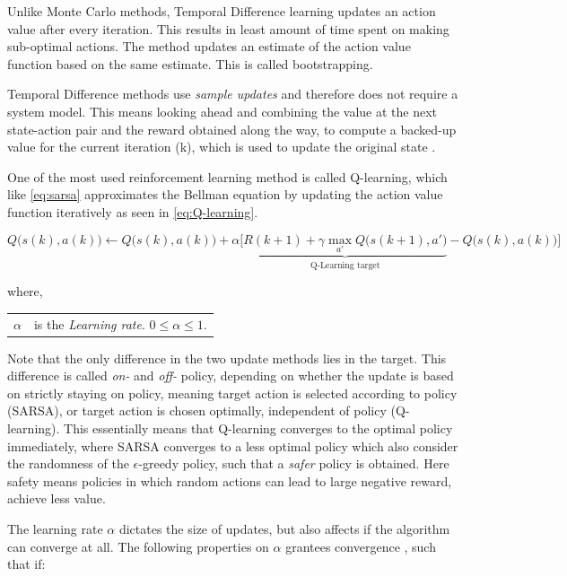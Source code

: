 Unlike Monte Carlo methods, Temporal Difference learning updates an action value after every iteration. This results in least amount of time spent on making sub-optimal actions. The method updates an estimate of the action value function based on the same estimate. This is called bootstrapping. 

Temporal Difference methods use \textit{sample updates} and therefore does not require a system model. This means looking ahead and combining the value at the next state-action pair and the reward obtained along the way, to compute a backed-up value for the current iteration (k), which is used to update the original state \cite{Sutton2020}.

One of the most used reinforcement learning method is called Q-learning, which like \cref{eq:sarsa} approximates the Bellman equation by updating the action value function iteratively  as seen in \cref{eq:Q-learning}.

\begin{equation}\label{eq:Q-learning}
	Q\bigg(s(k),a(k)\bigg)\leftarrow Q\bigg(s(k),a(k)\bigg)+\alpha \Bigg[
	\underbrace{R(k+1)+\gamma \max_{a'} 
		Q\bigg(s(k+1),a'\bigg)}_{\text{Q-Learning target}}
	-Q\bigg(s(k),a(k)\bigg)
	\Bigg]
\end{equation}

where,
\begin{center}
	\begin{tabular}{l p{12cm}}
		$ \alpha $ & is the \textit{Learning rate}. $0\leq \alpha \leq 1$. \\
	\end{tabular}
\end{center}

Note that the only difference in the two update methods lies in the target. This difference is called \textit{on-} and \textit{off-} policy, depending on whether the update is based on strictly staying on policy, meaning target action is selected according to policy (SARSA), or target action is chosen optimally, independent of policy (Q-learning). This essentially means that Q-learning converges to the optimal policy immediately, where SARSA converges to a less optimal policy which also consider the randomness of the $ \epsilon$-greedy policy, such that a \textit{safer} policy is obtained. Here safety means policies in which random actions can lead to large negative reward, achieve less value.

The learning rate $\alpha$ dictates the size of updates, but also affects if the algorithm can converge at all. The following properties on $ \alpha $ grantees convergence \cite{Busoniu2010}, such that if: 

